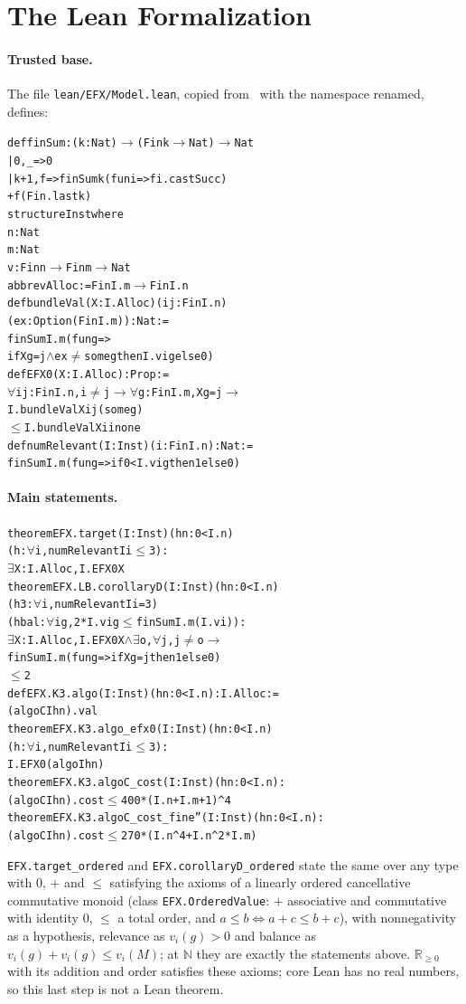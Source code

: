 \documentclass[runningheads,11pt]{llncs}
\begin{document}
\section{The Lean Formalization}\label{app:lean}

\paragraph{Trusted base.} The file \texttt{lean/EFX/Model.lean}, copied from~\cite{MrdEfx} with the namespace renamed, defines:
\begin{alltt}
def finSum : (k : Nat) \(\to\) (Fin k \(\to\) Nat) \(\to\) Nat
  | 0, _ => 0
  | k+1, f => finSum k (fun i => f i.castSucc)
                + f (Fin.last k)
structure Inst where
  n : Nat
  m : Nat
  v : Fin n \(\to\) Fin m \(\to\) Nat
abbrev Alloc := Fin I.m \(\to\) Fin I.n
def bundleVal (X : I.Alloc) (i j : Fin I.n)
    (ex : Option (Fin I.m)) : Nat :=
  finSum I.m (fun g =>
    if X g = j \(\wedge\) ex \(\ne\) some g then I.v i g else 0)
def EFX0 (X : I.Alloc) : Prop :=
  \(\forall\) i j : Fin I.n, i \(\ne\) j \(\to\) \(\forall\) g : Fin I.m, X g = j \(\to\)
    I.bundleVal X i j (some g)
      \(\le\) I.bundleVal X i i none
def numRelevant (I : Inst) (i : Fin I.n) : Nat :=
  finSum I.m (fun g => if 0 < I.v i g then 1 else 0)
\end{alltt}

\paragraph{Main statements.}
\begin{alltt}
theorem EFX.target (I : Inst) (hn : 0 < I.n)
    (h : \(\forall\) i, numRelevant I i \(\le\) 3) :
    \(\exists\) X : I.Alloc, I.EFX0 X
theorem EFX.LB.corollaryD (I : Inst) (hn : 0 < I.n)
    (h3 : \(\forall\) i, numRelevant I i = 3)
    (hbal : \(\forall\) i g, 2 * I.v i g \(\le\) finSum I.m (I.v i)) :
    \(\exists\) X : I.Alloc, I.EFX0 X \(\wedge\) \(\exists\) o, \(\forall\) j, j \(\ne\) o \(\to\)
      finSum I.m (fun g => if X g = j then 1 else 0)
        \(\le\) 2
def EFX.K3.algo (I : Inst) (hn : 0 < I.n) : I.Alloc :=
  (algoC I hn).val
theorem EFX.K3.algo_efx0 (I : Inst) (hn : 0 < I.n)
    (h : \(\forall\) i, numRelevant I i \(\le\) 3) :
    I.EFX0 (algo I hn)
theorem EFX.K3.algoC_cost (I : Inst) (hn : 0 < I.n) :
    (algoC I hn).cost \(\le\) 400 * (I.n + I.m + 1) ^ 4
theorem EFX.K3.algoC_cost_fine'' (I : Inst) (hn : 0 < I.n) :
    (algoC I hn).cost \(\le\) 270 * (I.n ^ 4 + I.n ^ 2 * I.m)
\end{alltt}
\texttt{EFX.target\_ordered} and \texttt{EFX.corollaryD\_ordered} state the same over any type with $0$, $+$ and $\le$ satisfying the axioms of a linearly ordered cancellative commutative monoid (class \texttt{EFX.OrderedValue}: $+$ associative and commutative with identity $0$, $\le$ a total order, and $a\le b\iff a+c\le b+c$), with nonnegativity as a hypothesis, relevance as $v_i(g)>0$ and balance as $v_i(g)+v_i(g)\le v_i(M)$; at $\mathbb{N}$ they are exactly the statements above. $\mathbb{R}_{\ge0}$ with its addition and order satisfies these axioms; core Lean has no real numbers, so this last step is not a Lean theorem.
\end{document}
